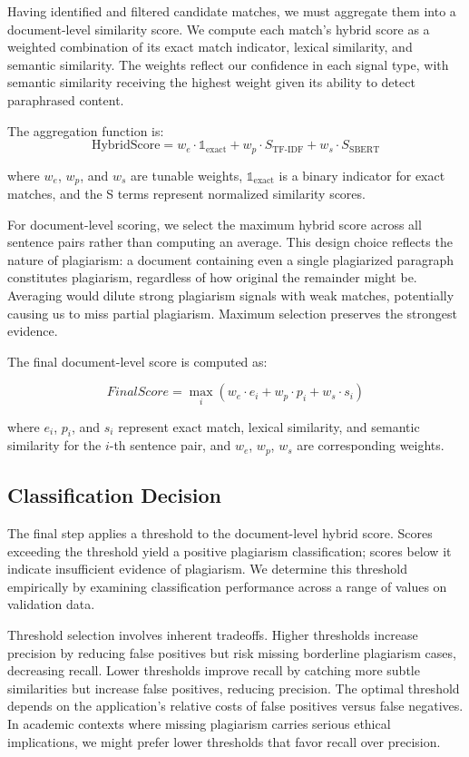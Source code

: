 \documentclass[conference]{IEEEtran}
\begin{document}
Having identified and filtered candidate matches, we must aggregate them into a document-level similarity score. We compute each match's hybrid score as a weighted combination of its exact match indicator, lexical similarity, and semantic similarity. The weights reflect our confidence in each signal type, with semantic similarity receiving the highest weight given its ability to detect paraphrased content.

The aggregation function is:
$$\text{HybridScore} = w_e \cdot \mathbb{1}_{\text{exact}} + w_p \cdot S_{\text{TF-IDF}} + w_s \cdot S_{\text{SBERT}}$$

where $w_e$, $w_p$, and $w_s$ are tunable weights, $\mathbb{1}_{\text{exact}}$ is a binary indicator for exact matches, and the S terms represent normalized similarity scores.

For document-level scoring, we select the maximum hybrid score across all sentence pairs rather than computing an average. This design choice reflects the nature of plagiarism: a document containing even a single plagiarized paragraph constitutes plagiarism, regardless of how original the remainder might be. Averaging would dilute strong plagiarism signals with weak matches, potentially causing us to miss partial plagiarism. Maximum selection preserves the strongest evidence.

The final document-level score is computed as:

\begin{equation}
FinalScore = \max_i \left( w_e \cdot e_i + w_p \cdot p_i + w_s \cdot s_i \right)
\end{equation}

where $e_i$, $p_i$, and $s_i$ represent exact match, lexical similarity, and semantic similarity for the $i$-th sentence pair, and $w_e$, $w_p$, $w_s$ are corresponding weights.
\subsection{Classification Decision}

The final step applies a threshold to the document-level hybrid score. Scores exceeding the threshold yield a positive plagiarism classification; scores below it indicate insufficient evidence of plagiarism. We determine this threshold empirically by examining classification performance across a range of values on validation data.

Threshold selection involves inherent tradeoffs. Higher thresholds increase precision by reducing false positives but risk missing borderline plagiarism cases, decreasing recall. Lower thresholds improve recall by catching more subtle similarities but increase false positives, reducing precision. The optimal threshold depends on the application's relative costs of false positives versus false negatives. In academic contexts where missing plagiarism carries serious ethical implications, we might prefer lower thresholds that favor recall over precision.
\end{document}
